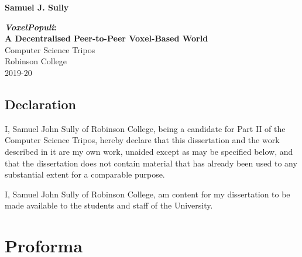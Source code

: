 \documentclass[12pt,notitlepage,a4paper]{report}
\newcommand{\voxpop}{\emph{VoxelPopuli}}
\begin{document}
	
	
	\pagestyle{empty}
	
	\hfill{\LARGE \bf Samuel J. Sully}
	
	\vspace*{60mm}
	\begin{center}
		\Huge
		{\bf \voxpop:\\ A Decentralised Peer-to-Peer Voxel-Based World} \\
		\vspace*{5mm}
		Computer Science Tripos \\
		\vspace*{5mm}
		Robinson College \\
		\vspace*{5mm}
		2019-20
	\end{center}
	
	\clearpage
	
	\setcounter{page}{1}
	\pagestyle{plain}
	
	\newpage
	\section*{Declaration}
	
	I, Samuel John Sully of Robinson College, being a candidate for Part II of the Computer
	Science Tripos, hereby declare that this dissertation and the work described in it are
	my own work, unaided except as may be specified below, and that the dissertation does
	not contain material that has already been used to any substantial extent for a comparable
	purpose.
	
	\bigskip
	
	\noindent I, Samuel John Sully of Robinson College, am content for my dissertation to be made available to the students and staff of the University.
	
	\clearpage
	
	\chapter*{Proforma}
	
\end{document}
